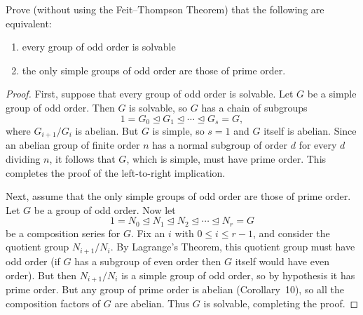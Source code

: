 
 Prove (without using the Feit--Thompson Theorem) that
the following are equivalent:
\begin{enumerate}
\item every group of odd order is solvable
\item the only simple groups of odd order are those of prime order.
\end{enumerate}
\begin{proof}
  First, suppose that every group of odd order is solvable. Let $G$ be
  a simple group of odd order. Then $G$ is solvable, so $G$ has a
  chain of subgroups
  \begin{equation*}
    1 = G_0\trianglelefteq G_1\trianglelefteq\cdots\trianglelefteq
    G_s = G,
  \end{equation*}
  where $G_{i+1}/G_i$ is abelian. But $G$ is simple, so $s = 1$ and
  $G$ itself is abelian. Since an abelian group of finite order $n$
  has a normal subgroup of order $d$ for every $d$ dividing $n$, it
  follows that $G$, which is simple, must have prime order. This
  completes the proof of the left-to-right implication.

  Next, assume that the only simple groups of odd order are those of
  prime order. Let $G$ be a group of odd order. Now let
  \begin{equation*}
    1 = N_0 \trianglelefteq N_1 \trianglelefteq
    N_2 \trianglelefteq\cdots\trianglelefteq
    N_r = G
  \end{equation*}
  be a composition series for $G$. Fix an $i$ with $0\leq i\leq r-1$,
  and consider the quotient group $N_{i+1}/N_i$. By Lagrange's
  Theorem, this quotient group must have odd order (if $G$ has a
  subgroup of even order then $G$ itself would have even order). But
  then $N_{i+1}/N_i$ is a simple group of odd order, so by hypothesis
  it has prime order. But any group of prime order is abelian
  (Corollary~10), so all the composition factors of $G$ are
  abelian. Thus $G$ is solvable, completing the proof.
\end{proof}

